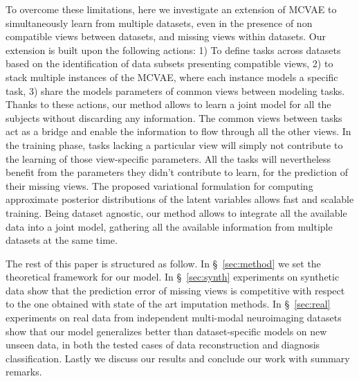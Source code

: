 To overcome these limitations, here we investigate an extension of MCVAE to simultaneously learn from multiple datasets, even in the presence of non compatible views between datasets, and missing views within datasets.
Our extension  is built upon the following actions:
1) To define tasks across datasets based on the identification of data subsets presenting compatible views,
2) to stack multiple instances of the MCVAE, where each instance models a specific task,
3) share the models parameters of common views between modeling tasks.
%
Thanks to these actions, our method allows to learn a joint model for all the subjects without discarding any information.
The common views between tasks act as a bridge and enable the information to flow through all the other views.
In the training phase, tasks lacking a particular view will simply not contribute to the learning of those view-specific parameters.
All the tasks will nevertheless benefit from the parameters they didn't contribute to learn, for the prediction of their missing views.
The proposed variational formulation for computing approximate posterior distributions of the latent variables allows fast and scalable training.
Being dataset agnostic, our method allows to integrate all the available data into a joint model, gathering  all the available information from multiple datasets at the same time.

The rest of this paper is structured as follow.
In \S~\ref{sec:method} we set the theoretical framework for our model.
In \S~\ref{sec:synth} experiments on synthetic data show that the prediction error of missing views is competitive with respect to the one obtained with state of the art imputation methods.
In \S~\ref{sec:real} experiments on real data from independent multi-modal neuroimaging datasets show that our model generalizes better than dataset-specific models on new unseen data, in both the tested cases of data reconstruction and diagnosis classification.
Lastly we discuss our results and conclude our work with summary remarks.
